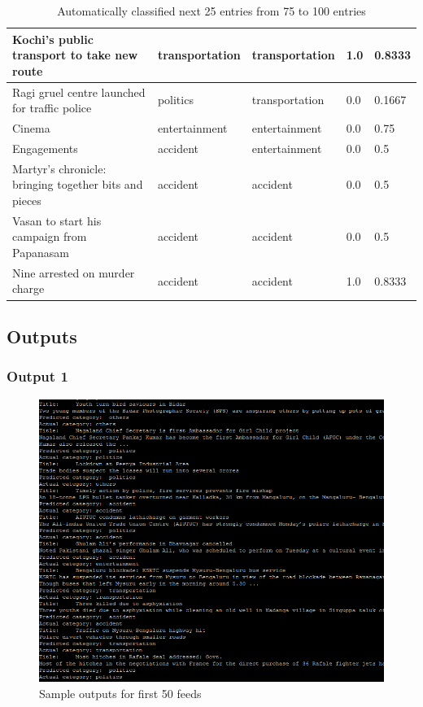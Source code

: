 \begin{table}
\begin{tabular}{ | p{5.4cm} | p{2.0cm} | p{2.0cm}|p{1.3cm}|p{1.5cm}|}
\hline
Kochi’s public transport to take new route & transportation  & transportation & 1.0 & 0.8333 \\
\hline
Ragi gruel centre launched for traffic police & politics  & transportation & 0.0 & 0.1667 \\
\hline
Cinema & entertainment  & entertainment & 0.0 & 0.75 \\
\hline
Engagements & accident  & entertainment & 0.0 & 0.5 \\
\hline
Martyr’s chronicle: bringing together bits and pieces & accident  & accident & 0.0 & 0.5 \\
\hline
Vasan to start his campaign from Papanasam & accident  & accident & 0.0 & 0.5 \\
\hline
Nine arrested on murder charge & accident  & accident & 1.0 & 0.8333 \\
\hline

\end{tabular}
\caption{Automatically classified next 25 entries from 75 to 100 entries }
\label{table:ql2-4}
\end{table}

\newpage

\subsection{Outputs}
\subsubsection{Output 1}
\begin{figure}[ht]    
    \begin{center}
        \includegraphics[scale=0.8]{sample_first50.png}
        \caption{Sample outputs for first 50 feeds}
        \label{Samplet1}
    \end{center}
\end{figure}
\newpage

